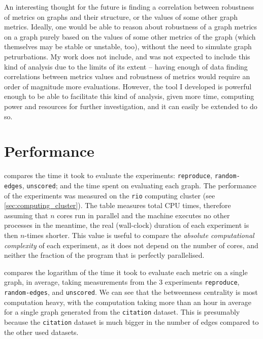 An interesting thought for the future is finding a correlation between robustness of metrics on graphs and their structure, or the values of some other graph metrics.
Ideally, one would be able to reason about robustness of a graph metrics on a graph purely based on the values of some other metrics of the graph (which themselves may be stable or unstable, too), without the need to simulate graph petrurbations.
My work does not include, and was not expected to include this kind of analysis due to the limits of its extent -- having enough of data finding correlations between metrics values and robustness of metrics would require an order of magnitude more evaluations.
However, the \graffs tool I developed is powerful enough to be able to facilitate this kind of analysis, given more time, computing power and resources for further investigation, and it can easily be extended to do so.


\section{Performance}




 compares the time it took to evaluate the experiments: \texttt{reproduce}, \texttt{random-edges}, \texttt{unscored}; and the time spent on evaluating each graph.
The performance of the experiments was measured on the \texttt{rio} computing cluster (see \autoref{sec:computing_cluster}).
The table measures total CPU times, therefore assuming that $n$ cores run in parallel and the machine executes no other processes in the meantime, the real (wall-clock) duration of each experiment is then $n$-times shorter.
This value is useful to compare the \textsl{absolute computational complexity} of each experiment, as it does not depend on the number of cores, and neither the fraction of the program that is perfectly parallelised.

 compares the logarithm of the time it took to evaluate each metric on a single graph, in average, taking measurements from the 3 experiments \texttt{reproduce}, \texttt{random-edges}, and \texttt{unscored}.
We can see that the betweenness centrality is most computation heavy, with the computation taking more than an hour in average for a single graph generated from the \texttt{citation} dataset.
This is presumably because the \texttt{citation} dataset is much bigger in the number of edges compared to the other used datasets.




